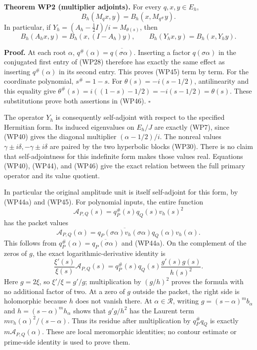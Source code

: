 \documentclass[
  10pt,
  a4paper,
]{article}
\begin{document}
\textbf{Theorem WP2 (multiplier adjoints).} For every \(q,x,y\in E_h\),
\[
B_h(M_qx,y)=B_h(x,M_{q^\#}y).
\tag{WP45}
\] In particular, if \(Y_h=(A_h-\frac12I)/i=M_{\theta(s)}\), then \[
B_h(A_hx,y)=B_h(x,(I-A_h)y),
\qquad B_h(Y_hx,y)=B_h(x,Y_hy).
\tag{WP46}
\]

\textbf{Proof.} At each root \(\alpha\),
\(q^\#(\alpha)=\overline{q(\sigma\alpha)}\). Inserting a factor
\(q(\sigma\alpha)\) in the conjugated first entry of (WP28) therefore
has exactly the same effect as inserting \(q^\#(\alpha)\) in its second
entry. This proves (WP45) term by term. For the coordinate polynomial,
\(s^\#=1-s\). For \(\theta(s)=-i(s-1/2)\), antilinearity and this
equality give \(\theta^\#(s)=i((1-s)-1/2)=-i(s-1/2)=\theta(s)\). These
substitutions prove both assertions in (WP46). \(\square\)

The operator \(Y_h\) is consequently self-adjoint with respect to the
specified Hermitian form. Its induced eigenvalues on \(E_h/J\) are
exactly (WP7), since (WP40) gives the diagonal multiplier
\((\alpha-1/2)/i\). The nonreal values
\(\gamma\pm i\delta,-\gamma\pm i\delta\) are paired by the two
hyperbolic blocks (WP30). There is no claim that self-adjointness for
this indefinite form makes those values real. Equations (WP40), (WP44),
and (WP46) give the exact relation between the full primary operator and
its value quotient.

In particular the original amplitude unit is itself self-adjoint for
this form, by (WP44a) and (WP45). For polynomial inputs, the entire
function \[
\mathcal A_{P,Q}(s)=q_P^\#(s)q_Q(s)v_h(s)^2
\tag{WP46a}
\] has the packet values \[
\mathcal A_{P,Q}(\alpha)
=\overline{q_P(\sigma\alpha)v_h(\sigma\alpha)}
q_Q(\alpha)v_h(\alpha).
\tag{WP46b}
\] This follows from \(q_P^\#(\alpha)=\overline{q_P(\sigma\alpha)}\) and
(WP44a). On the complement of the zeros of \(g\), the exact
logarithmic-derivative identity is \[
\frac{\xi'(s)}{\xi(s)}\mathcal A_{P,Q}(s)
=q_P^\#(s)q_Q(s)\frac{g'(s)g(s)}{h(s)^2}.
\tag{WP46c}
\] Here \(g=2\xi\), so \(\xi'/\xi=g'/g\); multiplication by \((g/h)^2\)
proves the formula with no additional factor of two. At a zero of \(g\)
outside the packet, the right side is holomorphic because \(h\) does not
vanish there. At \(\alpha\in\mathcal R\), writing
\(g=(s-\alpha)^mb_\alpha\) and \(h=(s-\alpha)^mh_\alpha\) shows that
\(g'g/h^2\) has the Laurent term \(m v_h(\alpha)^2/(s-\alpha)\). Thus
its residue after multiplication by \(q_P^\#q_Q\) is exactly
\(m\mathcal A_{P,Q}(\alpha)\). These are local meromorphic identities;
no contour estimate or prime-side identity is used to prove them.
\end{document}
